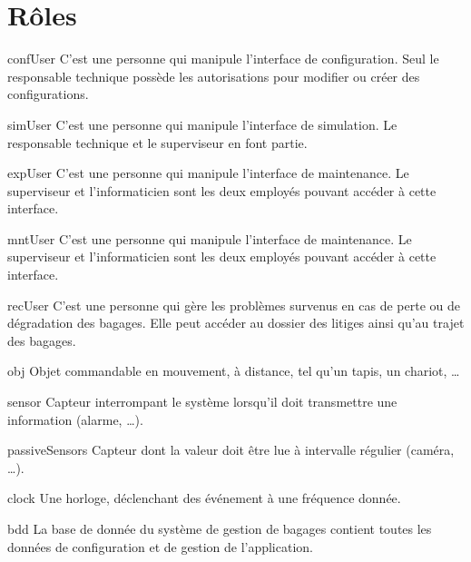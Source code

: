 \section{Rôles}




{confUser}
{C'est une personne qui manipule l'interface de configuration. Seul le responsable technique possède les autorisations pour modifier ou créer des configurations.}

{simUser}
{C'est une personne qui manipule l'interface de simulation. Le responsable technique et le superviseur en font partie.}

{expUser}
{C'est une personne qui manipule l'interface de maintenance. Le superviseur et l'informaticien sont les deux employés pouvant accéder à cette interface.}

{mntUser}
{C'est une personne qui manipule l'interface de maintenance. Le superviseur et l'informaticien sont les deux employés pouvant accéder à cette interface.}

{recUser}
{C'est une personne qui gère les problèmes survenus en cas de perte ou de dégradation des bagages. Elle peut accéder au dossier des litiges ainsi qu'au trajet des bagages.}

{obj}
{Objet commandable en mouvement, à distance, tel qu'un tapis, un chariot, \ldots}

{sensor}
{Capteur interrompant le système lorsqu'il doit transmettre une information (alarme, \ldots).}

{passiveSensors}
{Capteur dont la valeur doit être lue à intervalle régulier (caméra, \ldots).}

{clock}
{Une horloge, déclenchant des événement à une fréquence donnée.}

{bdd}
{La base de donnée du système de gestion de bagages contient toutes les données de configuration et de gestion de l'application.}


